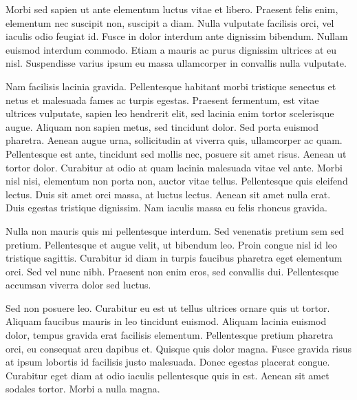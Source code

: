 \documentclass[a4paper, 12pt]{article}
\begin{document}
Morbi sed sapien ut ante elementum luctus vitae et libero. Praesent
felis enim, elementum nec suscipit non, suscipit a diam. Nulla
vulputate facilisis orci, vel iaculis odio feugiat id. Fusce in dolor
interdum ante dignissim bibendum. Nullam euismod interdum commodo.
Etiam a mauris ac purus dignissim ultrices at eu nisl. Suspendisse
varius ipsum eu massa ullamcorper in convallis nulla vulputate.

Nam facilisis lacinia gravida. Pellentesque habitant morbi tristique
senectus et netus et malesuada fames ac turpis egestas. Praesent
fermentum, est vitae ultrices vulputate, sapien leo hendrerit elit,
sed lacinia enim tortor scelerisque augue. Aliquam non sapien metus,
sed tincidunt dolor. Sed porta euismod pharetra. Aenean augue urna,
sollicitudin at viverra quis, ullamcorper ac quam. Pellentesque est
ante, tincidunt sed mollis nec, posuere sit amet risus. Aenean ut
tortor dolor. Curabitur at odio at quam lacinia malesuada vitae vel
ante. Morbi nisl nisi, elementum non porta non, auctor vitae tellus.
Pellentesque quis eleifend lectus. Duis sit amet orci massa, at luctus
lectus. Aenean sit amet nulla erat. Duis egestas tristique dignissim.
Nam iaculis massa eu felis rhoncus gravida.

Nulla non mauris quis mi pellentesque interdum. Sed venenatis pretium
sem sed pretium. Pellentesque et augue velit, ut bibendum leo. Proin
congue nisl id leo tristique sagittis. Curabitur id diam in turpis
faucibus pharetra eget elementum orci. Sed vel nunc nibh. Praesent non
enim eros, sed convallis dui. Pellentesque accumsan viverra dolor sed
luctus.

Sed non posuere leo. Curabitur eu est ut tellus ultrices ornare quis
ut tortor. Aliquam faucibus mauris in leo tincidunt euismod. Aliquam
lacinia euismod dolor, tempus gravida erat facilisis elementum.
Pellentesque pretium pharetra orci, eu consequat arcu dapibus et.
Quisque quis dolor magna. Fusce gravida risus at ipsum lobortis id
facilisis justo malesuada. Donec egestas placerat congue. Curabitur
eget diam at odio iaculis pellentesque quis in est. Aenean sit amet
sodales tortor. Morbi a nulla magna.
\end{document}
